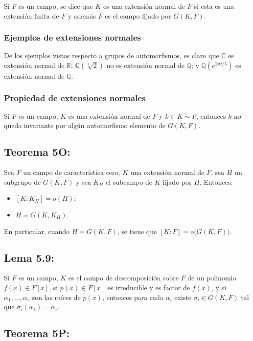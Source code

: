\documentclass{article}
\begin{document}
Si $F$ es un campo, se dice que $K$ es una extensión normal de $F$ si esta es una extensión finita de $F$ y además $F$ es el campo fijado por $G(K,F)$.

\subsubsection*{\color{teal} Ejemplos de extensiones normales}

De los ejemplos vistos respecto a grupos de automorfismos, es claro que $\mathbb{C}$ es  extensión normal de $\mathbb{R}$; $\mathbb{Q}(\sqrt[3]{2})$ no es extensión normal de $\mathbb{Q}$; y $\mathbb{Q}(e^{2\pi i/5})$ es extensión normal de $\mathbb{Q}$.

\subsubsection*{\color{purple} Propiedad de extensiones normales}

Si $F$ es un campo, $K$ es una extensión normal de $F$ y $k\in K\sim F$, entonces $k$ no queda invariante por algún automorfismo elemento de $G(K,F)$.

\subsection*{\color{red} Teorema 5O:}

Sea $F$ un campo de característica cero, $K$ una extensión normal de $F$, sea $H$ un subgrupo de $G(K,F)$ y sea $K_H$ el subcampo de $K$ fijado por $H$. Entonces:
\begin{itemize}
\item $[K:K_H]=o(H)$;

\item $H=G(K,K_H)$.
\end{itemize}
En particular, cuando $H=G(K,F)$, se tiene que $[K:F]=o\big(G(K,F)\big)$.

\subsection*{\color{blue} Lema 5.9:}

Si $F$ es un campo, $K$ es el campo de descomposición sobre $F$ de un polinomio $f(x)\in F[x]$, si $p(x)\in F[x]$ es irreducible y es factor de $f(x)$, y si $\alpha_1,\ldots,\alpha_r$ son las raíces de $p(x)$, entonces para cada $\alpha_i$ existe $\sigma_i\in G(K,F)$ tal que $\sigma_i(\alpha_1)=\alpha_i$.

\subsection*{\color{red} Teorema 5P:}
\end{document}
